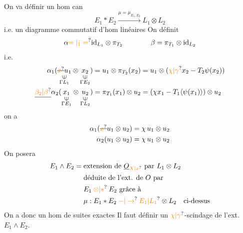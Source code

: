On va définir un hom can
\[
E_1*E_2\xrightarrow{\mu=\mu_{E_1,E_2}}L_1\otimes L_2
\]
i.e. un diagramme commutatif d'hom linéaires
On définit
\[
\alpha\unsure{=|_1=}\mathrm{id}_{L_1}\otimes\pi_{T_2}\qquad\qquad\beta=\pi_{T_1}\otimes\mathrm{id}_{L_2}
\]
i.e.
\[
\begin{aligned}
\alpha_1(\underset{\substack{\rotatebox{90}{$\in$}\\\Gamma L_1}}{\deleted{\unsure{x}}u_1}\otimes
\underset{\substack{\rotatebox{90}{$\in$}\\\Gamma E_2}}{x_2})
&=u_1\otimes\pi_{T_2}(x_2)=u_1\otimes(\unsure{\chi|\gamma}x_2-T_2\psi(x_2))\\
\deleted{\unsure{\beta_2|\beta}}\alpha_2(\underset{\substack{\rotatebox{90}{$\in$}\\\Gamma E_1}}{x_1}\otimes
\underset{\substack{\rotatebox{90}{$\in$}\\\Gamma L_2}}{u_2})
&=\pi_{T_1}(x_1)\otimes u_2=(\chi x_1-T_1\inserted{\psi(x_1)})\otimes u_2
\end{aligned}
\]
on a
\[
\begin{aligned}
\alpha_1(\deleted{\unsure{x}}u_1\otimes u_2)&=\chi\,u_1\otimes u_2\\
\alpha_2(u_1\otimes u_2)&=\chi\,u_1\otimes u_2
\end{aligned}
\]
On posera
\[
\begin{aligned}
E_1\wedge E_2={}&\text{extension de }\underline O_{\unsure{X|x}}\text{ par }L_1\otimes L_2\\
&\text{déduite de l'ext. de }O\text{ par}\\
&E_1\mathbin{\unsure{\otimes|*}}E_2\text{ grâce à}\\
&\mu:E_1*E_2\mathbin{\unsure{-|\to}}\unsure{E_1|L_1}\otimes L_2\quad\text{ci-dessus}
\end{aligned}
\]
On a donc un hom de suites exactes
Il faut définir un $\unsure{\chi|\gamma}$-scindage de l'ext. $E_1\wedge E_2$.

